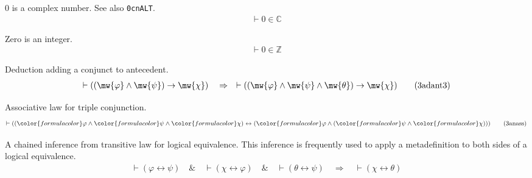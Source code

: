 \begin{lemma} {0 is a complex number. } See also {\tt 0cnALT}. 
\begin{align}
\vdash 0 \in \mathbb{C}\label{eq:0cn}\tag{0cn}
\end{align}
\end{lemma}


\begin{lemma} {Zero is an integer.}
\begin{align}
\vdash 0 \in \mathbb{Z}\label{eq:0z}\tag{0z}
\end{align}
\end{lemma}


\begin{lemma} {Deduction adding a conjunct to antecedent.}
\begin{align}
\vdash ( ( \mw{\varphi} \wedge \mw{\psi} ) \rightarrow \mw{\chi}
    )\quad\Rightarrow\quad \vdash ( ( \mw{\varphi} \wedge \mw{\psi} \wedge
    \mw{\theta} ) \rightarrow \mw{\chi} )\label{eq:3adant3}\tag{3adant3}
\end{align}
\end{lemma}

\begin{lemma} {Associative law for triple conjunction.}
\begin{align}
\vdash ( ( {\color{formulacolor}\varphi} \wedge {\color{formulacolor}\psi}
    \wedge {\color{formulacolor}\chi} ) \leftrightarrow (
    {\color{formulacolor}\varphi} \wedge ( {\color{formulacolor}\psi} \wedge
    {\color{formulacolor}\chi} ) ) )\label{eq:3anass}\tag{3anass}
\end{align}
\end{lemma}


\begin{lemma} {A chained inference from transitive law for logical equivalence.}  This
       inference is frequently used to apply a metadefinition to both sides of a
       logical equivalence.  %
\begin{align}
\vdash ( \varphi \leftrightarrow \psi )\quad\&\quad \vdash ( \chi \leftrightarrow \varphi )\quad\&\quad \vdash ( \theta \leftrightarrow \psi )\quad\Rightarrow\quad \vdash ( \chi \leftrightarrow \theta
    )\label{eq:3bitr4i}\tag{3bitr4i}
\end{align}
\end{lemma}


